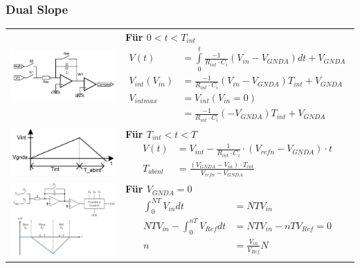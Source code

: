 \subsubsection{Dual Slope }
\begin{longtable}{cp{12cm}}
 \includegraphics[width=6cm, valign=t]{pictures/dualSlope11}
 & 
 \textbf{Für $0<t<T_{int}$}
 {\begin{align*}
      V(t)&=
      \int\limits_0^{t}\frac{-1}{R_{int}
      \cdot C_{i}}(V_{in}-V_{GNDA})dt+V_{GNDA}\\
      V_{int}(V_{in})&=\frac{-1}{R_{int}
      \cdot C_{i}}(V_{in}-V_{GNDA})T_{int}+V_{GNDA}\\
      V_{intmax}&=V_{int}(V_{in}=0)\\
                &=\frac{-1}{R_{int}
      \cdot C_{i}}(-V_{GNDA})T_{int}+V_{GNDA}
 \end{align*}} \\
 
 \includegraphics[width=6cm, valign=t]{pictures/dualSlope12}
 &  
 \textbf{Für $T_{int}<t<T$}
 {\begin{align*}
  V(t)&=V_{int}-\frac{1}{R_{int}\cdot C_{i}}\cdot
  (V_{refn}-V_{GNDA}) \cdot t\\
   T_{abint}&=\frac{(V_{GNDA}-V_{in}) \cdot T_{int}}{V_{refn}-V_{GNDA}}
 \end{align*}}\\
 
 \includegraphics[width=6cm, valign=t]{pictures/dualSlope2}
 &  
 \textbf{Für $V_{GNDA}=0$}
 {\begin{align*}
    \int^{NT}_{0}V_{in}dt&=NTV_{in}\\
      NTV_{in}-\int^{nT}_{0}V_{Ref}dt&=NTV_{in}-nTV_{Ref}=0\\
      n&=\frac{V_{in}}{V_{Ref}}N\\
  \end{align*}}\\
  

\end{longtable}
